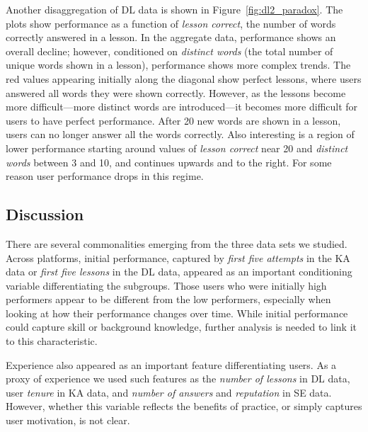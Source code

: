 \documentclass[letterpaper]{article} %
\begin{document}
Another disaggregation of DL data is shown in Figure~\ref{fig:dl2_paradox}. The plots show performance as a function of \emph{lesson correct}, the number of words correctly answered in a lesson. In the aggregate data, performance shows an overall decline; however, conditioned on \emph{distinct words} (the total number of unique words shown in a lesson), performance shows more complex trends. The red values appearing initially along the diagonal show perfect lessons, where users answered all words they were shown correctly. However, as the lessons become more difficult---more distinct words are introduced---it becomes more difficult for users to have perfect performance. After 20 new words are shown in a lesson, users can no longer answer all the words correctly. Also interesting is a region of lower performance starting around values of \emph{lesson correct} near 20 and \emph{distinct words} between 3 and 10, and continues upwards and to the right. For some reason user performance drops in this regime.


\subsection{Discussion}
There are several commonalities emerging from the three data sets we studied. Across platforms,  initial performance, captured by \emph{first five attempts} in the KA data or \emph{first five lessons} in the DL data, appeared as an important conditioning variable differentiating the subgroups. Those users who were initially high performers appear to be different from the low performers, especially when looking at how their performance changes over time. While initial performance could capture skill or background knowledge, further analysis is needed to link it to this characteristic.

Experience also appeared as an important feature differentiating users. As a proxy of experience we used such features as the \emph{number of lessons} in DL data, user \emph{tenure} in KA data, and \emph{number of answers} and \emph{reputation} in SE data. However, whether this variable reflects the benefits of practice, or simply captures user motivation, is not clear.
\end{document}
